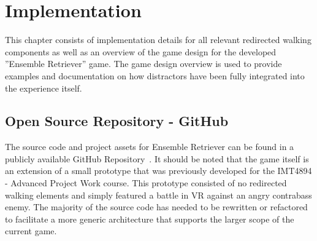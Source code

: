 \chapter{Implementation}
\label{chap:implementation}
This chapter consists of implementation details for all relevant redirected walking components as well as an overview of the game design for the developed ''Ensemble Retriever'' game. The game design overview is used to provide examples and documentation on how distractors have been fully integrated into the experience itself. 

\section{Open Source Repository - GitHub}
The source code and project assets for Ensemble Retriever can be found in a publicly available GitHub Repository~\cite{projectRepository}. It should be noted that the game itself is an extension of a small prototype that was previously developed for the IMT4894 - Advanced Project Work course. This prototype consisted of no redirected walking elements and simply featured a battle in VR against an angry contrabass enemy. The majority of the source code has needed to be rewritten or refactored to facilitate a more generic architecture that supports the larger scope of the current game.  

